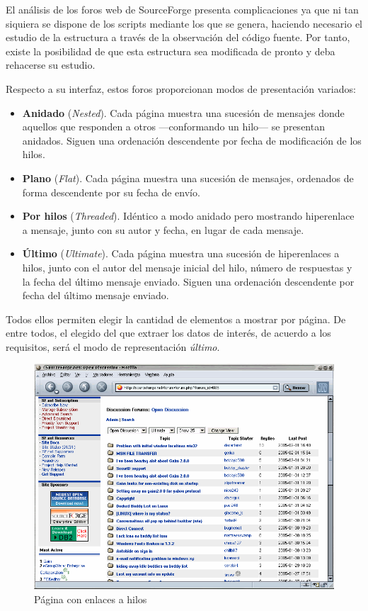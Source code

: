 El análisis de los foros web de SourceForge presenta complicaciones ya que
ni tan siquiera se dispone de los scripts mediante los que se genera,
haciendo necesario el estudio de la estructura a través de la observación
del código fuente. Por tanto, existe la posibilidad de que esta estructura
sea modificada de pronto y deba rehacerse su estudio.

Respecto a su interfaz, estos foros proporcionan modos de presentación
variados:
\begin{itemize}
\item \textbf{Anidado} (\textit{Nested}). Cada página muestra una sucesión
de mensajes donde aquellos que responden a otros ---conformando un hilo---
se presentan anidados. Siguen una ordenación descendente por fecha de
modificación de los hilos.
\item \textbf{Plano} (\textit{Flat}). Cada página muestra una sucesión de
mensajes, ordenados de forma descendente por su fecha de envío.
\item \textbf{Por hilos} (\textit{Threaded}). Idéntico a modo anidado pero
mostrando hiperenlace a mensaje, junto con su autor y fecha, en lugar de cada
mensaje.
\item \textbf{Último} (\textit{Ultimate}). Cada página muestra una sucesión
de hiperenlaces a hilos, junto con el autor del mensaje inicial del hilo,
número de respuestas y la fecha del último mensaje enviado. Siguen una
ordenación descendente por fecha del último mensaje enviado.
\end{itemize}
Todos ellos permiten elegir la cantidad de elementos a mostrar por página.
De entre todos, el elegido del que extraer los datos de interés, de acuerdo
a los requisitos, será el modo de representación \textit{último}.

 \begin{figure}[H]
    \centering
    \includegraphics[bb=0 0 800 600, width=12cm, keepaspectratio]{img/foro1}
    \caption{Página con enlaces a hilos}
    \label{figura:foro_hilos}
 \end{figure}

